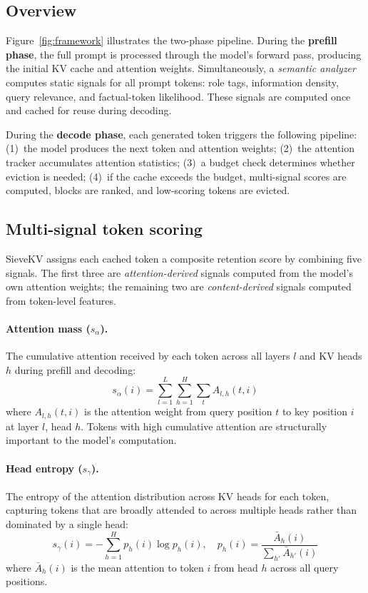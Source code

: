 \documentclass[runningheads]{llncs}
\begin{document}
\subsection{Overview}

Figure~\ref{fig:framework} illustrates the two-phase pipeline.
During the \textbf{prefill phase}, the full prompt is processed through the
model's forward pass, producing the initial KV cache and attention weights.
Simultaneously, a \emph{semantic analyzer} computes static signals for all
prompt tokens: role tags, information density, query relevance, and
factual-token likelihood.
These signals are computed once and cached for reuse during decoding.

During the \textbf{decode phase}, each generated token triggers the following
pipeline:
(1)~the model produces the next token and attention weights;
(2)~the attention tracker accumulates attention statistics;
(3)~a budget check determines whether eviction is needed;
(4)~if the cache exceeds the budget, multi-signal scores are computed,
blocks are ranked, and low-scoring tokens are evicted.

\subsection{Multi-signal token scoring}
\label{sec:scoring}

SieveKV assigns each cached token a composite retention score by
combining five signals.
The first three are \emph{attention-derived} signals computed from the
model's own attention weights; the remaining two are \emph{content-derived}
signals computed from token-level features.

\paragraph{Attention mass ($s_\alpha$).}
The cumulative attention received by each token across all layers $l$ and
KV heads $h$ during prefill and decoding:
\begin{equation}
  s_\alpha(i) = \sum_{l=1}^{L} \sum_{h=1}^{H} \sum_{t} A_{l,h}(t, i)
\end{equation}
where $A_{l,h}(t, i)$ is the attention weight from query position $t$ to
key position $i$ at layer $l$, head $h$.
Tokens with high cumulative attention are structurally important to the
model's computation.

\paragraph{Head entropy ($s_\gamma$).}
The entropy of the attention distribution across KV heads for each token,
capturing tokens that are broadly attended to across multiple heads rather
than dominated by a single head:
\begin{equation}
  s_\gamma(i) = -\sum_{h=1}^{H} p_h(i) \log p_h(i), \quad
  p_h(i) = \frac{\bar{A}_h(i)}{\sum_{h'} \bar{A}_{h'}(i)}
\end{equation}
where $\bar{A}_h(i)$ is the mean attention to token $i$ from head $h$
across all query positions.
\end{document}
